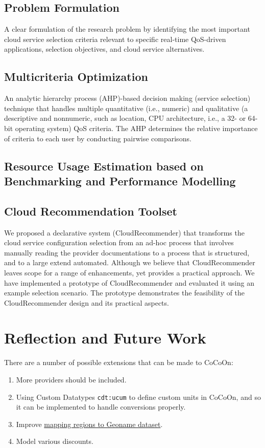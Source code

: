 \subsection{Problem Formulation}
A clear formulation of the research problem by identifying the most important
cloud service selection criteria relevant to specific real-time
QoS-driven applications, selection objectives, and cloud service
alternatives.

\subsection{Multicriteria Optimization}
An analytic hierarchy process (AHP)-based decision making 
(service selection) technique that handles multiple
quantitative (i.e., numeric) and qualitative (a descriptive and
nonnumeric, such as location, CPU architecture, i.e., a 32- or
64-bit operating system) QoS criteria. The AHP determines
the relative importance of criteria to each user by conducting
pairwise comparisons.

\subsection{Resource Usage Estimation based on Benchmarking and Performance Modelling}

\subsection{Cloud Recommendation Toolset}
We proposed a declarative system (CloudRecommender) that transforms
the cloud service configuration selection from an ad-hoc process that involves
manually reading the provider documentations to a process that is structured, and to a
large extend automated. Although we believe that CloudRecommender leaves scope
for a range of enhancements, yet provides a practical approach. We have implemented
a prototype of CloudRecommender and evaluated it using an example selection
scenario. The prototype demonstrates the feasibility of the CloudRecommender
design and its practical aspects.

\section{Reflection and Future Work}
There are a number of possible extensions that can be made to CoCoOn:
\begin{enumerate}
    \item More providers should be included.
    \item Using Custom Datatypes \texttt{cdt:ucum} \cite{lefrancois_eswc_2018} to define custom units in CoCoOn, and so it can be implemented to handle conversions properly.
    \item Improve \href{https://github.com/miranda-zhang/cloud-computing-schema/tree/master/example/geonames_rdf/azure}{mapping regions to Geoname dataset}.
    \item Model various discounts.
\end{enumerate}

